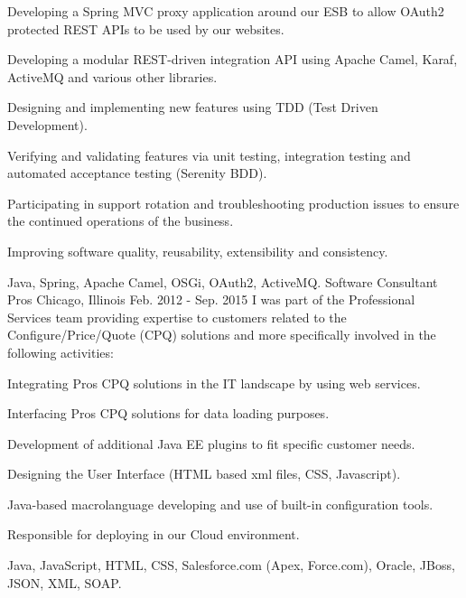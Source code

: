 \begin{cventries}
{\begin{cvitems}
  \item Developing a Spring MVC proxy application around our ESB to allow OAuth2 protected REST APIs to be used by our websites.
  \item Developing a modular REST-driven integration API using Apache Camel, Karaf, ActiveMQ and various other libraries.
  \item Designing and implementing new features using TDD (Test Driven Development).
  \item Verifying and validating features via unit testing, integration testing and automated acceptance testing (Serenity BDD).
  \item Participating in support rotation and troubleshooting production issues to ensure the continued operations of the business.
  \item Improving software quality, reusability, extensibility and consistency.
\end{cvitems}
    } %
    {Java, Spring, Apache Camel, OSGi, OAuth2, ActiveMQ.}
  \cventryfive
    {Software Consultant} %
    {Pros} %
    {Chicago, Illinois} %
    {Feb. 2012 - Sep. 2015} %
    {I was part of the Professional Services team providing expertise to customers related to the
Configure/Price/Quote (CPQ) solutions and more specifically involved in the following activities:}
    {
      \begin{cvitems} %
        	\item Integrating Pros CPQ solutions in the IT landscape by using web services.
		\item Interfacing Pros CPQ solutions for data loading purposes.
		\item Development of additional Java EE plugins to fit specific customer needs.
    		\item Designing the User Interface (HTML based xml files, CSS, Javascript).
    		\item Java-based macrolanguage developing and use of built-in configuration tools.
    		\item Responsible for deploying in our Cloud environment.
      \end{cvitems}
    }
    {Java, JavaScript, HTML, CSS, Salesforce.com (Apex, Force.com), Oracle, JBoss, JSON, XML, SOAP.}

\end{cventries}
